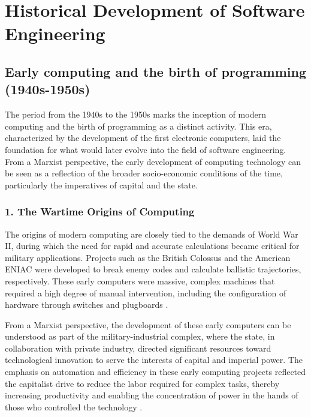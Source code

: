 \begin{refsection}
\begin{multicols}{2}
\end{multicols}
\newpage

\section{Historical Development of Software Engineering}
\begin{multicols}{2}
\subsection{Early computing and the birth of programming (1940s-1950s)}
{\small
The period from the 1940s to the 1950s marks the inception of modern computing and the birth of programming as a distinct activity. This era, characterized by the development of the first electronic computers, laid the foundation for what would later evolve into the field of software engineering. From a Marxist perspective, the early development of computing technology can be seen as a reflection of the broader socio-economic conditions of the time, particularly the imperatives of capital and the state.

\subsubsection*{1. The Wartime Origins of Computing}

The origins of modern computing are closely tied to the demands of World War II, during which the need for rapid and accurate calculations became critical for military applications. Projects such as the British Colossus and the American ENIAC were developed to break enemy codes and calculate ballistic trajectories, respectively. These early computers were massive, complex machines that required a high degree of manual intervention, including the configuration of hardware through switches and plugboards \cite{randell1972origins}.

From a Marxist perspective, the development of these early computers can be understood as part of the military-industrial complex, where the state, in collaboration with private industry, directed significant resources toward technological innovation to serve the interests of capital and imperial power. The emphasis on automation and efficiency in these early computing projects reflected the capitalist drive to reduce the labor required for complex tasks, thereby increasing productivity and enabling the concentration of power in the hands of those who controlled the technology \cite{braverman1974labor}.

}
\end{multicols}
\end{refsection}
